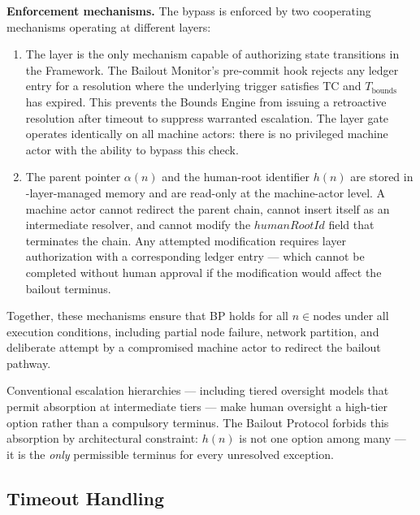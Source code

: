 \medskip\noindent\textbf{Enforcement mechanisms.} The bypass is enforced by two cooperating mechanisms operating at different layers:

\begin{enumerate}
\item[\textbf{Fact Layer gate.}] The \fact{} layer is the only mechanism capable of authorizing state transitions in the \bxthree{} Framework. The Bailout Monitor's pre-commit hook rejects any ledger entry for a resolution where the underlying trigger satisfies TC and $T_{\text{bounds}}$ has expired. This prevents the Bounds Engine from issuing a retroactive resolution after timeout to suppress warranted escalation. The \fact{} layer gate operates identically on all machine actors: there is no privileged machine actor with the ability to bypass this check.

\item[\textbf{Immutable parent-pointer and human-root architecture.}] The parent pointer $\alpha(n)$ and the human-root identifier $h(n)$ are stored in \fact-layer-managed memory and are read-only at the machine-actor level. A machine actor cannot redirect the parent chain, cannot insert itself as an intermediate resolver, and cannot modify the $humanRootId$ field that terminates the chain. Any attempted modification requires \purpose{} layer authorization with a corresponding ledger entry — which cannot be completed without human approval if the modification would affect the bailout terminus.
\end{enumerate}

Together, these mechanisms ensure that BP holds for all $n \in \text{nodes}$ under all execution conditions, including partial node failure, network partition, and deliberate attempt by a compromised machine actor to redirect the bailout pathway.

Conventional escalation hierarchies — including tiered oversight models that permit absorption at intermediate tiers — make human oversight a high-tier option rather than a compulsory terminus. The Bailout Protocol forbids this absorption by architectural constraint: $h(n)$ is not one option among many — it is the \emph{only} permissible terminus for every unresolved exception.

\subsection{Timeout Handling}\label{sec:timeout-handling}

